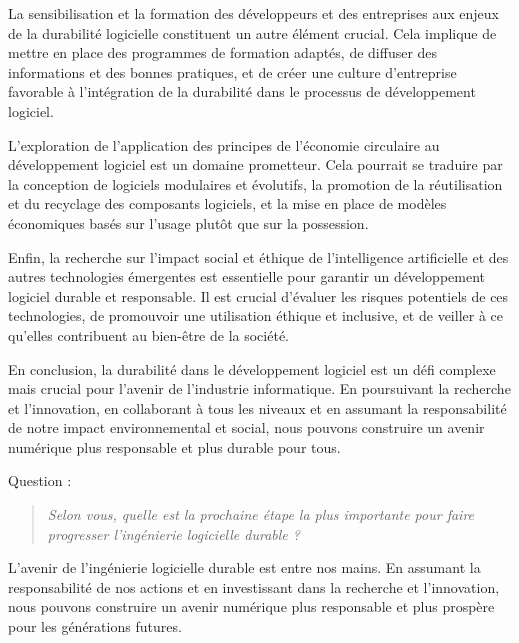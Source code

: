 La sensibilisation et la formation des développeurs et des entreprises aux enjeux de la durabilité logicielle constituent un autre élément crucial. Cela implique de mettre en place des programmes de formation adaptés, de diffuser des informations et des bonnes pratiques, et de créer une culture d'entreprise favorable à l'intégration de la durabilité dans le processus de développement logiciel.

L'exploration de l'application des principes de l'économie circulaire au développement logiciel est un domaine prometteur. Cela pourrait se traduire par la conception de logiciels modulaires et évolutifs, la promotion de la réutilisation et du recyclage des composants logiciels, et la mise en place de modèles économiques basés sur l'usage plutôt que sur la possession.

Enfin, la recherche sur l'impact social et éthique de l'intelligence artificielle et des autres technologies émergentes est essentielle pour garantir un développement logiciel durable et responsable. Il est crucial d'évaluer les risques potentiels de ces technologies, de promouvoir une utilisation éthique et inclusive, et de veiller à ce qu'elles contribuent au bien-être de la société.

En conclusion, la durabilité dans le développement logiciel est un défi complexe mais crucial pour l'avenir de l'industrie informatique. En poursuivant la recherche et l'innovation, en collaborant à tous les niveaux et en assumant la responsabilité de notre impact environnemental et social, nous pouvons construire un avenir numérique plus responsable et plus durable pour tous.

Question :
\begin{quote}
    \emph{Selon vous, quelle est la prochaine étape la plus importante pour faire progresser l'ingénierie logicielle durable ?}
\end{quote}

L'avenir de l'ingénierie logicielle durable est entre nos mains. En assumant la responsabilité de nos actions et en investissant dans la recherche et l'innovation, nous pouvons construire un avenir numérique plus responsable et plus prospère pour les générations futures.

